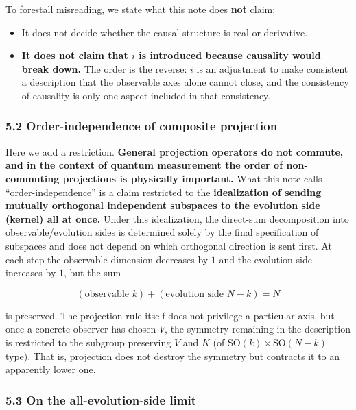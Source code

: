 \documentclass[
]{article}
\providecommand{\tightlist}{%
  \setlength{\itemsep}{0pt}\setlength{\parskip}{0pt}}
\begin{document}
To forestall misreading, we state what this note does \textbf{not}
claim:

\begin{itemize}
\tightlist
\item
  It does not decide whether the causal structure is real or derivative.
\item
  \textbf{It does not claim that \(i\) is introduced because causality
  would break down.} The order is the reverse: \(i\) is an adjustment to
  make consistent a description that the observable axes alone cannot
  close, and the consistency of causality is only one aspect included in
  that consistency.
\end{itemize}

\subsubsection{5.2 Order-independence of composite
projection}\label{order-independence-of-composite-projection}

Here we add a restriction. \textbf{General projection operators do not
commute, and in the context of quantum measurement the order of
non-commuting projections is physically important.} What this note calls
``order-independence'' is a claim restricted to the \textbf{idealization
of sending mutually orthogonal independent subspaces to the evolution
side (kernel) all at once.} Under this idealization, the direct-sum
decomposition into observable/evolution sides is determined solely by
the final specification of subspaces and does not depend on which
orthogonal direction is sent first. At each step the observable
dimension decreases by \(1\) and the evolution side increases by \(1\),
but the sum

\[(\text{observable }k)+(\text{evolution side }N-k)=N\]

is preserved. The projection rule itself does not privilege a particular
axis, but once a concrete observer has chosen \(V\), the symmetry
remaining in the description is restricted to the subgroup preserving
\(V\) and \(K\) (of \(\mathrm{SO}(k)\times\mathrm{SO}(N-k)\) type). That
is, projection does not destroy the symmetry but contracts it to an
apparently lower one.

\subsubsection{5.3 On the all-evolution-side
limit}\label{on-the-all-evolution-side-limit}
\end{document}
